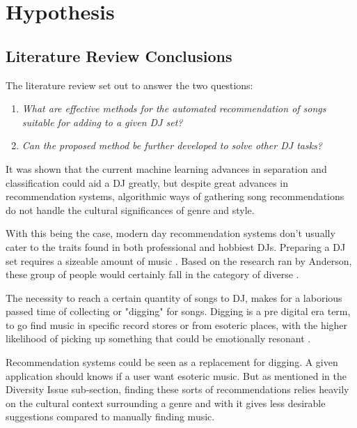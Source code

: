 
\graphicspath{{Chapter4/}}

\chapter{Hypothesis}

\section{Literature Review Conclusions}

The literature review set out to answer the two questions:
 
 \begin{enumerate}
 	\item \textit{What are effective methods for the automated recommendation of songs suitable for adding to a given DJ set?}
 	
 	\item \textit{Can the proposed method be further developed to solve other DJ tasks?}
	\end{enumerate}
 
 It was shown that the current machine learning advances in separation and classification could aid a DJ greatly, but despite great advances in recommendation systems, algorithmic ways of gathering song recommendations do not handle the cultural significances of genre and style.

With this being the case, modern day recommendation systems don't usually cater to the traits found in both professional and hobbiest DJs. Preparing a DJ set requires a sizeable amount of music \citep{allen_djs_2021}. Based on the research ran by Anderson, these group of people would certainly fall in the category of diverse \citep{anderson_algorithmic_2020}.

The necessity to reach a certain quantity of songs to DJ, makes for a laborious passed time of collecting or "digging" for songs. Digging is a pre digital era term, to go find music in specific record stores or from esoteric places, with the higher likelihood of picking up something that could be emotionally resonant \citep{allen_djs_2021}.

Recommendation systems could be seen as a replacement for digging. A given application should knows if a user want esoteric music. But as mentioned in the Diversity Issue sub-section, finding these sorts of recommendations relies heavily on the cultural context surrounding a genre and with it gives less desirable suggestions compared to manually finding music. 

